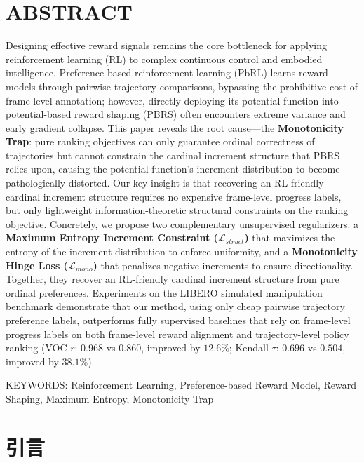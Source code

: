 \section*{ABSTRACT}
Designing effective reward signals remains the core bottleneck for applying reinforcement learning (RL) to complex continuous control and embodied intelligence. Preference-based reinforcement learning (PbRL) learns reward models through pairwise trajectory comparisons, bypassing the prohibitive cost of frame-level annotation; however, directly deploying its potential function into potential-based reward shaping (PBRS) often encounters extreme variance and early gradient collapse. This paper reveals the root cause---the \textbf{Monotonicity Trap}: pure ranking objectives can only guarantee ordinal correctness of trajectories but cannot constrain the cardinal increment structure that PBRS relies upon, causing the potential function's increment distribution to become pathologically distorted. Our key insight is that recovering an RL-friendly cardinal increment structure requires no expensive frame-level progress labels, but only lightweight information-theoretic structural constraints on the ranking objective. Concretely, we propose two complementary unsupervised regularizers: a \textbf{Maximum Entropy Increment Constraint ($\mathcal{L}_{struct}$)} that maximizes the entropy of the increment distribution to enforce uniformity, and a \textbf{Monotonicity Hinge Loss ($\mathcal{L}_{mono}$)} that penalizes negative increments to ensure directionality. Together, they recover an RL-friendly cardinal increment structure from pure ordinal preferences. Experiments on the LIBERO simulated manipulation benchmark demonstrate that our method, using only cheap pairwise trajectory preference labels, outperforms fully supervised baselines that rely on frame-level progress labels on both frame-level reward alignment and trajectory-level policy ranking (VOC $r$: $0.968$ vs $0.860$, improved by $12.6\%$; Kendall $\tau$: $0.696$ vs $0.504$, improved by $38.1\%$).

\vspace{1em}\noindent
{\hei KEYWORDS:}
{\songti \rmfamily Reinforcement Learning, Preference-based Reward Model, Reward Shaping, Maximum Entropy, Monotonicity Trap}

\clearpage



\setcounter{page}{1}

\section{引言}


